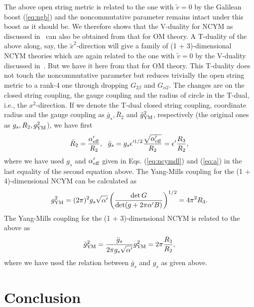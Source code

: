 \documentclass[a4paper,12pt]{article}
\newcommand{\sect}[1]{\setcounter{equation}{0}\section{#1}}
\begin{document}
	The above open string metric is related to the one with $\tilde
v = 0$ by the Galilean boost (\ref{eq:ngb}) and the noncommutative
parameter remains intact under this boost as it should be. We therefore
shows that the V-duality for NCYM as discussed in~\cite{CLW} can also be
obtained from that for OM theory. A T-duality of the above along, say,
the $\tilde x^2$-direction will give a family of (1 + 3)-dimensional
NCYM theories which are again related to the one with $\tilde v =0$ by
the V-duality discussed in~\cite{CLW}. But we have it here from that for 
OM theory. This T-duality does not touch the noncommutative parameter
but reduces trivially the open string metric to a rank-4 one through
dropping $G_{2\beta}$ and $G_{\alpha 2}$. The changes are on the closed
string coupling, the gauge
coupling and the radius of circle in the T-dual, i.e., the
$x^2$-direction. If we denote the T-dual closed string coupling,
coordinate radius
and the gauge coupling as $\bar g_s, \bar R_2$ and $\bar g^2_{\rm YM}$, 
respectively (the original ones as $g_s, R_2, g^2_{\rm YM}$), we have
first
\begin{equation}
\bar R_2 = \frac{\alpha'_{\rm eff}}{R_2}, \ \  \bar g_s = g_s
\epsilon'^{1/2} \frac{\sqrt{\alpha'_{\rm eff}}}{R_2} = \epsilon'
\frac{R_3}{R_2},
\label{eq:tpr}
\end{equation}
where we have used $g_s$ and $\alpha'_{\rm eff}$ given in Eqs. 
(\ref{eq:ncymdl}) and (\ref{eq:a}) in the last equality of the second
equation above.  The Yang-Mills coupling for the (1 + 4)-dimensional
NCYM can be calculated as
\begin{equation}
g^2_{\rm YM} = (2\pi)^2 g_s \sqrt{\alpha'} \left(\frac{\det G}
{\det(g + 2\pi\alpha' B)}\right)^{1/2} = 4\pi^2 R_3.
\end{equation}
The Yang-Mills coupling for the (1 + 3)-dimensional NCYM is related to
the above as
\begin{equation}
\bar g^2_{\rm YM} = \frac{\bar g_s}{2\pi g_s \sqrt{\alpha'}} g^2_{\rm YM}
= 2\pi \frac{R_3}{R_2},
\end{equation}
where we have used the relation between $\bar g_s$ and $g_s$ as given above.

\sect{Conclusion}
\end{document}
